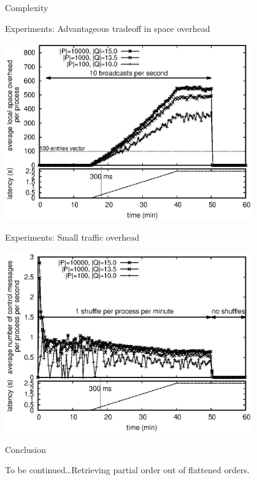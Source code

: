 \documentclass[10pt, xcolor={usenames, dvipsnames}]{beamer}
\begin{document}
\begin{frame}{Complexity}

  \begin{table}
    \begin{center}
      \caption{\label{table:complexity} Complexity of broadcast algorithms at
        each process. $N$ the number of processes that ever broadcast a
        message. $P$ the number of processes in the system. $W$ the number of
        messages received but not delivered yet. $Q_i$ is the number of incoming
        communication means. $M$ is the number of messages already delivered
        that should be received again from at least one process in $Q_i$.}
      
    \end{center}
  \end{table}

\end{frame}

\begin{frame}{Experiments: Advantageous tradeoff in space overhead}

  \begin{center}
    \includegraphics[width=0.8\textwidth]{img/overhead.eps}
  \end{center}

\end{frame}

\begin{frame}{Experiments: Small traffic overhead}
  \begin{center}
    \includegraphics[width=0.8\textwidth]{img/controlmessages.eps}
  \end{center}
\end{frame}


\begin{frame}{Conclusion}
\end{frame}

\begin{frame}[standout]
  To be continued\ldots Retrieving partial order out of flattened orders.
\end{frame}
\end{document}
